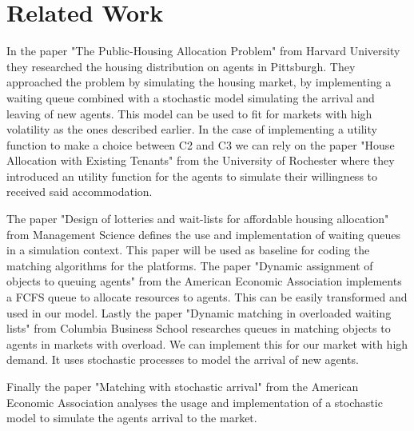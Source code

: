 \chapter{Related Work}

In the paper "The Public-Housing Allocation Problem" \cite{thakral2016public} from Harvard University they researched the housing distribution on agents in Pittsburgh. They approached the problem by simulating the housing market, by implementing a waiting queue combined with a stochastic model simulating the arrival and leaving of new agents. This model can be used to fit for markets with high volatility as the ones described earlier. In the case of implementing a utility function to make a choice between C2 and C3 we can rely on the paper "House Allocation with Existing Tenants" \cite{abdulkadirouglu1999house} from the University of Rochester where they introduced an utility function for the agents to simulate their willingness to received said accommodation.

The paper "Design of lotteries and wait-lists for affordable housing allocation" \cite{arnosti2020design} from Management Science defines the use and implementation of waiting queues in a simulation context. This paper will be used as baseline for coding the matching algorithms for the platforms. The paper "Dynamic assignment of objects to queuing agents" \cite{bloch2017dynamic} from the American Economic Association implements a FCFS queue to allocate resources to agents. This can be easily transformed and used in our model. Lastly the paper "Dynamic matching in overloaded waiting lists" \cite{leshno2019dynamic} from Columbia Business School researches queues in matching objects to agents in markets with overload. We can implement this for our market with high demand. It uses stochastic processes to model the arrival of new agents.

Finally the paper "Matching with stochastic arrival" \cite{thakral2019matching} from the American Economic Association analyses the usage and implementation of a stochastic model to simulate the agents arrival to the market.